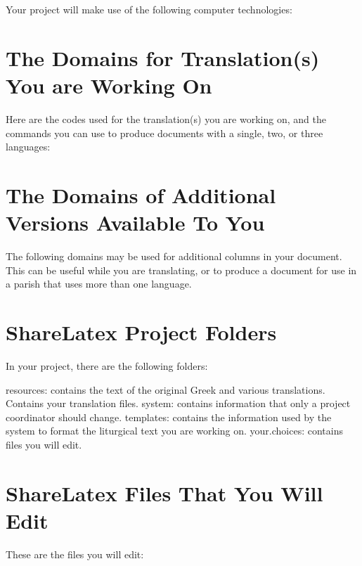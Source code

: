 \documentclass[]{memoir}
\begin{document}
Your project will make use of the following computer technologies:


\section{The Domains for Translation(s) You are Working On}

Here are the codes used for the translation(s) you are working on, and the commands you can use to produce documents with a single, two, or three languages:  


\section{The Domains of Additional Versions Available To You}

The following domains may be used for additional columns in your document.  This can be useful while you are translating, or to produce a document for use in a parish that uses more than one language.


\section{ShareLatex Project Folders}

In your project, there are the following folders:

\pex

\a resources: contains the text of the original Greek and various translations.  Contains your translation files.
\a system: contains information that only a project coordinator should change.
\a templates: contains the information used by the system to format the liturgical text you are working on.
\a your.choices: contains files you will edit.
\xe

\section{ShareLatex Files That You Will Edit}

These are the files you will edit:
\end{document}

